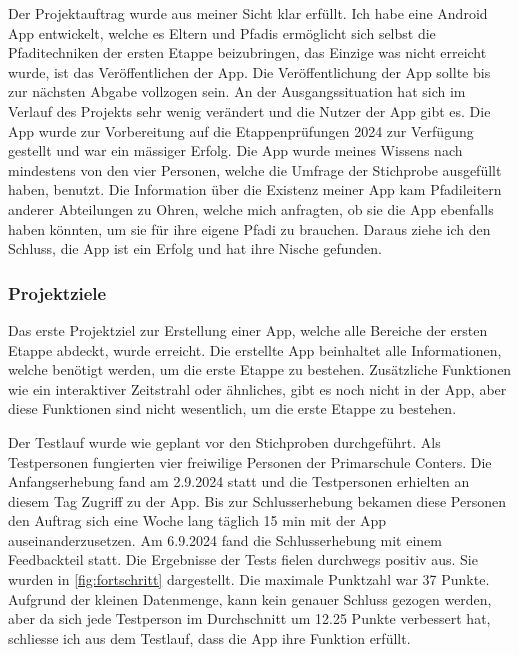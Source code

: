 Der Projektauftrag wurde aus meiner Sicht klar erfüllt. Ich habe eine Android App entwickelt, welche es Eltern und Pfadis ermöglicht sich selbst die Pfaditechniken der ersten Etappe beizubringen, das Einzige was nicht erreicht wurde, ist das Veröffentlichen der App. Die Veröffentlichung der App sollte bis zur nächsten Abgabe vollzogen sein. An der Ausgangssituation hat sich im Verlauf des Projekts sehr wenig verändert und die Nutzer der App gibt es. Die App wurde zur Vorbereitung auf die Etappenprüfungen 2024 zur Verfügung gestellt und war ein mässiger Erfolg. Die App wurde meines Wissens nach mindestens von den vier Personen, welche die Umfrage der Stichprobe ausgefüllt haben, benutzt. Die Information über die Existenz meiner App kam Pfadileitern anderer Abteilungen zu Ohren, welche mich anfragten, ob sie die App ebenfalls haben könnten, um sie für ihre eigene Pfadi zu brauchen. Daraus ziehe ich den Schluss, die App ist ein Erfolg und hat ihre Nische gefunden.

\subsubsection{Projektziele}

Das erste Projektziel zur Erstellung einer App, welche alle Bereiche der ersten Etappe abdeckt, wurde erreicht. Die erstellte App beinhaltet alle Informationen, welche benötigt werden, um die erste Etappe zu bestehen. Zusätzliche Funktionen wie ein interaktiver Zeitstrahl oder ähnliches, gibt es noch nicht in der App, aber diese Funktionen sind nicht wesentlich, um die erste Etappe zu bestehen. \par
Der Testlauf wurde wie geplant vor den Stichproben durchgeführt. Als Testpersonen fungierten vier freiwilige Personen der Primarschule Conters. Die Anfangserhebung fand am 2.9.2024 statt und die Testpersonen erhielten an diesem Tag Zugriff zu der App. Bis zur Schlusserhebung bekamen diese Personen den Auftrag sich eine Woche lang täglich 15 min mit der App auseinanderzusetzen. Am 6.9.2024 fand die Schlusserhebung mit einem Feedbackteil statt. Die Ergebnisse der Tests fielen durchwegs positiv aus. Sie wurden in \cref{fig:fortschritt} dargestellt. Die maximale Punktzahl war 37 Punkte. Aufgrund der kleinen Datenmenge, kann kein genauer Schluss gezogen werden, aber da sich jede Testperson im Durchschnitt um 12.25 Punkte verbessert hat, schliesse ich aus dem Testlauf, dass die App ihre Funktion erfüllt.

